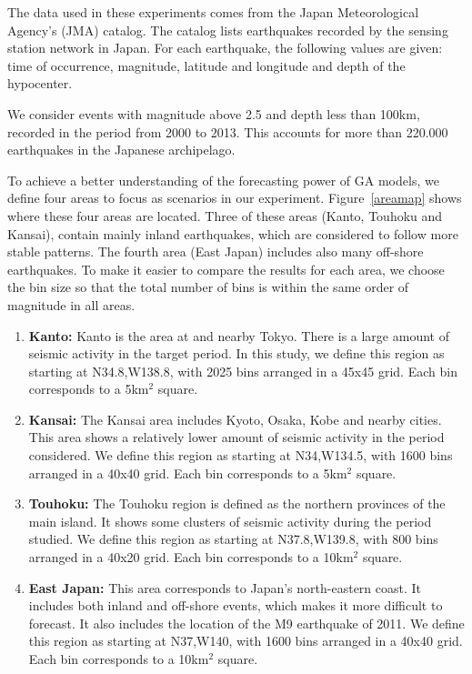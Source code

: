 \documentclass[a4paper,twoside]{article}
\begin{document}
The data used in these experiments comes from the Japan Meteorological
Agency's (JMA) catalog. The catalog lists earthquakes recorded by the
sensing station network in Japan. For each earthquake, the following
values are given: time of occurrence, magnitude, latitude and
longitude and depth of the hypocenter.

We consider events with magnitude above 2.5 and depth less than 100km,
recorded in the period from 2000 to 2013. This accounts for more than
220.000 earthquakes in the Japanese archipelago.

To achieve a better understanding of the forecasting power of GA
models, we define four areas to focus as scenarios in our
experiment. Figure~\ref{areamap} shows where these four areas are
located. Three of these areas (Kanto, Touhoku and Kansai), contain
mainly inland earthquakes, which are considered to follow more stable
patterns. The fourth area (East Japan) includes also many off-shore
earthquakes.  To make it easier to compare the results for each area,
we choose the bin size so that the total number of bins is within the
same order of magnitude in all areas.

\begin{enumerate}
  \item {\bf Kanto:} Kanto is the area at and nearby Tokyo. There is a
    large amount of seismic activity in the target period. In this
    study, we define this region as starting at N34.8,W138.8, with
    2025 bins arranged in a 45x45 grid. Each bin corresponds to a
    5km$^2$ square.
  \item {\bf Kansai:} The Kansai area includes Kyoto, Osaka, Kobe and
    nearby cities. This area shows a relatively lower amount of
    seismic activity in the period considered. We define this region
    as starting at N34,W134.5, with 1600 bins arranged in a 40x40
    grid. Each bin corresponds to a 5km$^2$ square.
  \item {\bf Touhoku:} The Touhoku region is defined as the northern
    provinces of the main island. It shows some clusters of seismic
    activity during the period studied. We define this region as
    starting at N37.8,W139.8, with 800 bins arranged in a 40x20
    grid. Each bin corresponds to a 10km$^2$ square.
  \item {\bf East Japan:} This area corresponds to Japan's
    north-eastern coast. It includes both inland and off-shore events,
    which makes it more difficult to forecast. It also includes the
    location of the M9 earthquake of 2011. We define this region as
    starting at N37,W140, with 1600 bins arranged in a 40x40
    grid. Each bin corresponds to a 10km$^2$ square.
\end{enumerate}
\end{document}
